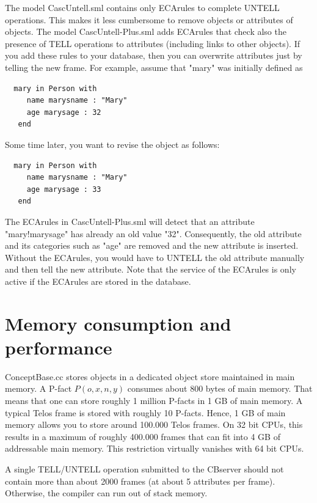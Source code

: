 The model CascUntell.sml contains only ECArules to complete UNTELL operations. This makes
it less cumbersome to remove objects or attributes of objects. The model CascUntell-Plus.sml
adds ECArules that check also the presence of TELL operations to attributes (including
links to other objects). If you add these rules to your database, then you can overwrite
attributes just by telling the new frame. For example, assume that "mary" was initially defined
as

\begin{verbatim}
  mary in Person with 
     name marysname : "Mary"
     age marysage : 32
   end 
\end{verbatim}

Some time later, you want to revise the object as follows:

\begin{verbatim}
  mary in Person with 
     name marysname : "Mary"
     age marysage : 33
   end 
\end{verbatim}



The ECArules in CascUntell-Plus.sml will detect that an attribute "mary!marysage" has already
an old value "32". Consequently, the old attribute and its categories such as "age" are removed
and the new attribute is inserted.
Without the ECArules, you would have to UNTELL the old attribute manually and then tell the new
attribute. Note that the service of the ECArules is only active if the ECArules are stored in the
database.




\section{Memory consumption and performance}
\label{sec:restrictions}

ConceptBase.cc stores objects in a dedicated object store maintained in
main memory. A P-fact $P(o,x,n,y)$ consumes about 800 bytes of main memory.
That means that one can store roughly 1 million P-facts in 1 GB of main memory.
A typical Telos frame is stored with roughly 10 P-facts. Hence, 1 GB of main
memory allows you to store around 100.000 Telos frames.
On 32 bit CPUs, this results in a maximum of roughly 400.000 frames that
can fit into 4 GB of addressable main memory. This restriction virtually
vanishes with 64 bit CPUs.

A single TELL/UNTELL operation submitted to the CBserver should
not contain more than about 2000 frames (at about 5 attributes per frame).
Otherwise, the compiler can run out of stack memory.

